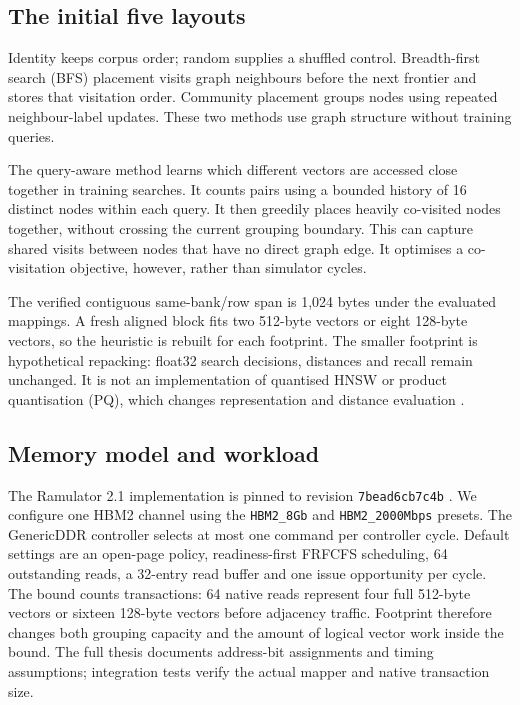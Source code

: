 \documentclass[conference]{IEEEtran}
\begin{document}
\subsection{The initial five layouts}
Identity keeps corpus order; random supplies a shuffled control. Breadth-first search (BFS) placement visits graph neighbours before the next frontier and stores that visitation order. Community placement groups nodes using repeated neighbour-label updates. These two methods use graph structure without training queries.

The query-aware method learns which different vectors are accessed close together in training searches. It counts pairs using a bounded history of 16 distinct nodes within each query. It then greedily places heavily co-visited nodes together, without crossing the current grouping boundary. This can capture shared visits between nodes that have no direct graph edge. It optimises a co-visitation objective, however, rather than simulator cycles.

The verified contiguous same-bank/row span is 1,024 bytes under the evaluated mappings. A fresh aligned block fits two 512-byte vectors or eight 128-byte vectors, so the heuristic is rebuilt for each footprint. The smaller footprint is hypothetical repacking: float32 search decisions, distances and recall remain unchanged. It is not an implementation of quantised HNSW or product quantisation (PQ), which changes representation and distance evaluation \cite{pq}.

\subsection{Memory model and workload}
The Ramulator 2.1 implementation is pinned to revision \texttt{7bead6cb7c4b} \cite{ramulator,ramsource}. We configure one HBM2 channel using the \texttt{HBM2\_8Gb} and \texttt{HBM2\_2000Mbps} presets. The GenericDDR controller selects at most one command per controller cycle. Default settings are an open-page policy, readiness-first FRFCFS scheduling, 64 outstanding reads, a 32-entry read buffer and one issue opportunity per cycle. The bound counts transactions: 64 native reads represent four full 512-byte vectors or sixteen 128-byte vectors before adjacency traffic. Footprint therefore changes both grouping capacity and the amount of logical vector work inside the bound. The full thesis documents address-bit assignments and timing assumptions; integration tests verify the actual mapper and native transaction size.
\end{document}
